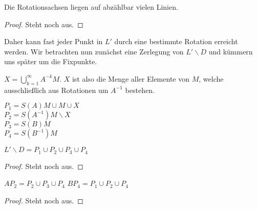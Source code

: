 \begin{lemma} \label{lemma:abz_rot_achsen}
Die Rotationsachsen liegen auf abzählbar vielen Linien.
\end{lemma}
\begin{proof} 
Steht noch aus.
\end{proof}


Daher kann fast jeder Punkt in $L'$ durch eine bestimmte Rotation erreicht werden. Wir betrachten nun zunächst eine 
Zerlegung von $L'\backslash D$ und kümmern uns später um die Fixpunkte.

\begin{definition}[Vereinigung X] \label{def:vereinigung_x} 
$X=\bigcup\limits_{k=1}^{\infty}A^{-k}M$. $X$ ist also die Menge aller Elemente von $M$, welche ausschließlich aus Rotationen
um $A^{-1}$ bestehen.
\end{definition}

\begin{definition} \label{def:zerlegung_L_D} 
$P_1=S(A)M\cup M\cup X$ \\
$P_2=S(A^{-1})M\backslash X$ \\
$P_3=S(B)M$ \\
$P_4=S(B^{-1})M$ \\
\end{definition}

\begin{lemma} \label{lemma:vereinigung_zerlegung}
$L'\backslash D=P_1\cup P_2\cup P_3\cup P_4$
\end{lemma}
\begin{proof} 
Steht noch aus.
\end{proof}

\begin{lemma} \label{lemma:rot_zerlegte_mengen}
$AP_2=P_2\cup P_3\cup P_4$
$BP_4=P_1\cup P_2\cup P_4$
\end{lemma}
\begin{proof} 
Steht noch aus.
\end{proof}

